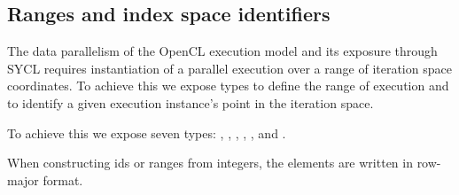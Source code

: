 %



\subsection{Ranges and index space identifiers}
\label{ranges-identifiers}

The data parallelism of the OpenCL execution model and its exposure
through SYCL requires instantiation of a parallel execution over a
range of iteration space coordinates. To achieve this we expose types
to define the range of execution and to identify a given execution
instance's point in the iteration space.

To achieve this we expose seven types: ,
, , , ,
 and .

When constructing ids or ranges from integers, the elements are
written in row-major format.

